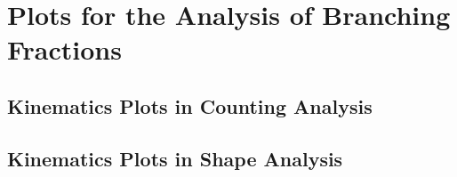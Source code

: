 
\chapter{Plots for the Analysis of \PW Branching Fractions}

\section{Kinematics Plots in Counting Analysis}

\FloatBarrier



\section{Kinematics Plots in Shape Analysis}

\FloatBarrier

\FloatBarrier

\FloatBarrier

\FloatBarrier

\FloatBarrier

\FloatBarrier

\FloatBarrier
